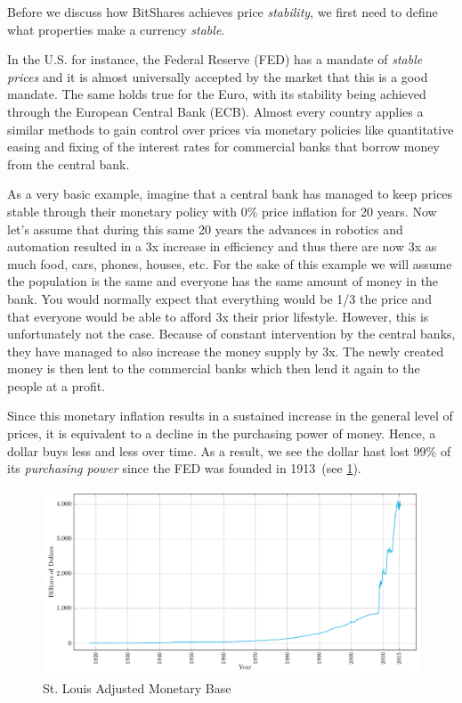 Before we discuss how BitShares achieves price \emph{stability}, we first need
to define what properties make a currency \emph{stable}.

In the U.S. for instance, the Federal Reserve (FED) has a mandate of
\emph{stable prices} and it is almost universally accepted by the market that
this is a good mandate. The same holds true for the Euro, with its stability
being achieved through the European Central Bank (ECB). Almost every country
applies a similar methods to gain control over prices via monetary policies
like quantitative easing and fixing of the interest rates for commercial banks
that borrow money from the central bank.

As a very basic example, imagine that a central bank has managed to keep prices
stable through their monetary policy with 0\% price inflation for 20 years.
Now let's assume that during this same 20 years the advances in robotics and
automation resulted in a 3x increase in efficiency and thus there are now 3x as
much food, cars, phones, houses, etc. For the sake of this example we will
assume the population is the same and everyone has the same amount of money in
the bank. You would normally expect that everything would be 1/3 the price and
that everyone would be able to afford 3x their prior lifestyle. However, this
is unfortunately not the case. Because of constant intervention by the central
banks, they have managed to also increase the money supply by 3x. The newly
created money is then lent to the commercial banks which then lend it again to
the people at a profit.

Since this monetary inflation results in a sustained increase in the general
level of prices, it is equivalent to a decline in the purchasing power of
money. Hence, a dollar buys less and less over time. As a result, we see the
dollar hast lost 99\% of its \emph{purchasing power} since the FED was founded
in 1913~(see \cref{fig:monetarybase}). 

\begin{figure}[!htp]
 \centering
 \includegraphics[width=\linewidth]{figures/monetary-base}
 \caption{St. Louis Adjusted Monetary Base~\cite{ambsl}}
 \label{fig:monetarybase}
\end{figure}


